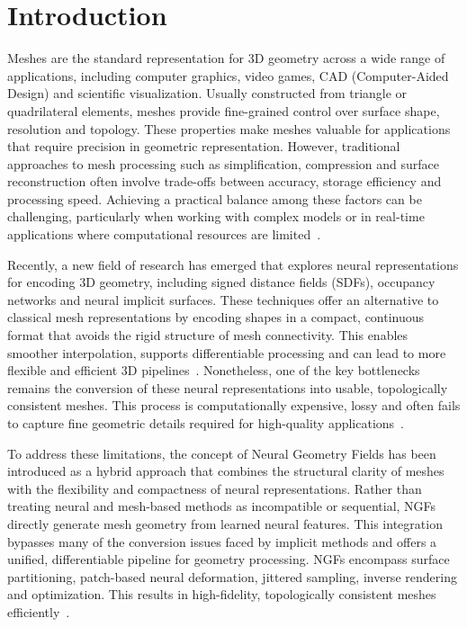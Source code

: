 \section{Introduction}\label{sec:introduction}

Meshes are the standard representation for 3D geometry across a wide range of applications, including computer graphics, video games, CAD (Computer-Aided Design) and scientific visualization.  
Usually constructed from triangle or quadrilateral elements, meshes provide fine-grained control over surface shape, resolution and topology.  
These properties make meshes valuable for applications that require precision in geometric representation.  
However, traditional approaches to mesh processing such as simplification, compression and surface reconstruction often involve trade-offs between accuracy, storage efficiency and processing speed.  
Achieving a practical balance among these factors can be challenging, particularly when working with complex models or in real-time applications where computational resources are limited~\cite{maglo2015}.  

Recently, a new field of research has emerged that explores neural representations for encoding 3D geometry, including signed distance fields (SDFs), occupancy networks and neural implicit surfaces.  
These techniques offer an alternative to classical mesh representations by encoding shapes in a compact, continuous format that avoids the rigid structure of mesh connectivity.  
This enables smoother interpolation, supports differentiable processing and can lead to more flexible and efficient 3D pipelines~\cite{park2019}.  
Nonetheless, one of the key bottlenecks remains the conversion of these neural representations into usable, topologically consistent meshes.  
This process is computationally expensive, lossy and often fails to capture fine geometric details required for high-quality applications~\cite{sivaram2024}.  

To address these limitations, the concept of Neural Geometry Fields has been introduced as a hybrid approach that combines the structural clarity of meshes with the flexibility and compactness of neural representations.  
Rather than treating neural and mesh-based methods as incompatible or sequential, NGFs directly generate mesh geometry from learned neural features.  
This integration bypasses many of the conversion issues faced by implicit methods and offers a unified, differentiable pipeline for geometry processing.  
NGFs encompass surface partitioning, patch-based neural deformation, jittered sampling, inverse rendering and optimization.  
This results in high-fidelity, topologically consistent meshes efficiently~\cite{sivaram2024}.  


